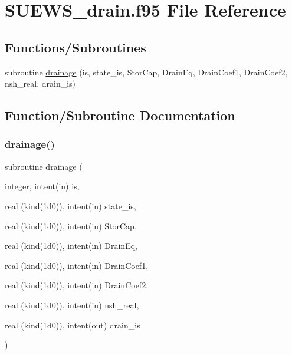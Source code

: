 \hypertarget{_s_u_e_w_s__drain_8f95}{}\section{S\+U\+E\+W\+S\+\_\+drain.\+f95 File Reference}
\label{_s_u_e_w_s__drain_8f95}
\subsection*{Functions/\+Subroutines}
\begin{DoxyCompactItemize}
\item 
subroutine \hyperlink{_s_u_e_w_s__drain_8f95_ad457462534fc9fec206ac998199dcb8d}{drainage} (is, state\+\_\+is, Stor\+Cap, Drain\+Eq, Drain\+Coef1, Drain\+Coef2, nsh\+\_\+real, drain\+\_\+is)
\end{DoxyCompactItemize}


\subsection{Function/\+Subroutine Documentation}
\mbox{\label{_s_u_e_w_s__drain_8f95_ad457462534fc9fec206ac998199dcb8d}} 
\subsubsection{\texorpdfstring{drainage()}{drainage()}}
{\footnotesize\ttfamily subroutine drainage (\begin{DoxyParamCaption}\item[{integer, intent(in)}]{is,  }\item[{real (kind(1d0)), intent(in)}]{state\+\_\+is,  }\item[{real (kind(1d0)), intent(in)}]{Stor\+Cap,  }\item[{real (kind(1d0)), intent(in)}]{Drain\+Eq,  }\item[{real (kind(1d0)), intent(in)}]{Drain\+Coef1,  }\item[{real (kind(1d0)), intent(in)}]{Drain\+Coef2,  }\item[{real (kind(1d0)), intent(in)}]{nsh\+\_\+real,  }\item[{real (kind(1d0)), intent(out)}]{drain\+\_\+is }\end{DoxyParamCaption})}



